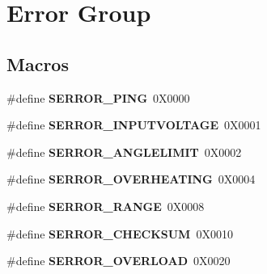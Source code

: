 \hypertarget{group__SERROR__GROUP}{}\section{Error Group}
\label{group__SERROR__GROUP}
\subsection*{Macros}
\begin{DoxyCompactItemize}
\item 
\#define {\bfseries S\+E\+R\+R\+O\+R\+\_\+\+P\+I\+NG}~0\+X0000\hypertarget{group__SERROR__GROUP_ga5a8520cf5e5994922ae52c5d2ee00ae8}{}\label{group__SERROR__GROUP_ga5a8520cf5e5994922ae52c5d2ee00ae8}

\item 
\#define {\bfseries S\+E\+R\+R\+O\+R\+\_\+\+I\+N\+P\+U\+T\+V\+O\+L\+T\+A\+GE}~0\+X0001\hypertarget{group__SERROR__GROUP_gadff4cfa680e4cd5d08561f5683a011e7}{}\label{group__SERROR__GROUP_gadff4cfa680e4cd5d08561f5683a011e7}

\item 
\#define {\bfseries S\+E\+R\+R\+O\+R\+\_\+\+A\+N\+G\+L\+E\+L\+I\+M\+IT}~0\+X0002\hypertarget{group__SERROR__GROUP_gad88c90b26053a3eed1f2517aea5368ef}{}\label{group__SERROR__GROUP_gad88c90b26053a3eed1f2517aea5368ef}

\item 
\#define {\bfseries S\+E\+R\+R\+O\+R\+\_\+\+O\+V\+E\+R\+H\+E\+A\+T\+I\+NG}~0\+X0004\hypertarget{group__SERROR__GROUP_ga00ae45eb6f3fc38d304adff95af9f5b3}{}\label{group__SERROR__GROUP_ga00ae45eb6f3fc38d304adff95af9f5b3}

\item 
\#define {\bfseries S\+E\+R\+R\+O\+R\+\_\+\+R\+A\+N\+GE}~0\+X0008\hypertarget{group__SERROR__GROUP_ga184fdfdf55d5b831be9de9b2152e361a}{}\label{group__SERROR__GROUP_ga184fdfdf55d5b831be9de9b2152e361a}

\item 
\#define {\bfseries S\+E\+R\+R\+O\+R\+\_\+\+C\+H\+E\+C\+K\+S\+UM}~0\+X0010\hypertarget{group__SERROR__GROUP_gaecd0ee5ce7e0c2d07fc401787f0a3cd9}{}\label{group__SERROR__GROUP_gaecd0ee5ce7e0c2d07fc401787f0a3cd9}

\item 
\#define {\bfseries S\+E\+R\+R\+O\+R\+\_\+\+O\+V\+E\+R\+L\+O\+AD}~0\+X0020\hypertarget{group__SERROR__GROUP_ga0c3768bf7aeb7a4264819e5f54ce6f8c}{}\label{group__SERROR__GROUP_ga0c3768bf7aeb7a4264819e5f54ce6f8c}


\end{DoxyCompactItemize}
